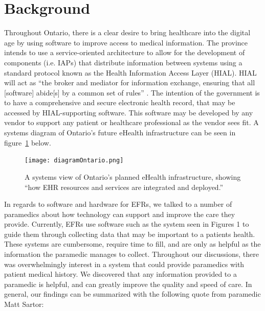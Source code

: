 
\section{Background}

Throughout Ontario, there is a clear desire to bring healthcare into the digital age by using software to improve access to medical information. The province intends to use a service-oriented architecture to allow for the development of components (i.e. IAPs) that distribute information between systems using a standard protocol known as the Health Information Access Layer (HIAL). HIAL will act as ``the broker and mediator for information exchange, ensuring that all [software] abide[s] by a common set of rules'' \cite{b1}. The intention of the government is to have a comprehensive and secure electronic health record, that may be accessed by HIAL-supporting software. This software may be developed by any vendor to support any patient or healthcare professional as the vendor sees fit. A systems diagram of Ontario's future eHealth infrastructure can be seen in figure~\ref{fig:eHealth1} below.


\begin{figure}[h]
  \centering
  \texttt{[image: diagramOntario.png]}
  \captionsetup{format=hang}
  \caption[Ontario eHealth Systems View]{A systems view of Ontario's planned eHealth infrastructure, showing ``how EHR resources and services are integrated and deployed.'' \cite{b1}}
  \label{fig:eHealth1}
\end{figure}

In regards to software and hardware for EFRs, we talked to a number of paramedics about how technology can support and improve the care they provide. Currently, EFRs use software such as the system seen in Figures 1 to guide them through collecting data that may be important to a patients health. These systems are cumbersome, require time to fill, and are only as helpful as the information the paramedic manages to collect. Throughout our discussions, there was overwhelmingly interest in a system that could provide paramedics with patient medical history. We discovered that any information provided to a paramedic is helpful, and can greatly improve the quality and speed of care. In general, our findings can be summarized with the following quote from paramedic Matt Sartor:

